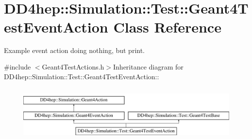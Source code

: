 \hypertarget{class_d_d4hep_1_1_simulation_1_1_test_1_1_geant4_test_event_action}{
\section{DD4hep::Simulation::Test::Geant4TestEventAction Class Reference}
\label{class_d_d4hep_1_1_simulation_1_1_test_1_1_geant4_test_event_action}
}


Example event action doing nothing, but print.  


{\ttfamily \#include $<$Geant4TestActions.h$>$}Inheritance diagram for DD4hep::Simulation::Test::Geant4TestEventAction::\begin{figure}[H]
\begin{center}
\leavevmode
\includegraphics[height=2.84746cm]{class_d_d4hep_1_1_simulation_1_1_test_1_1_geant4_test_event_action}
\end{center}
\end{figure}
